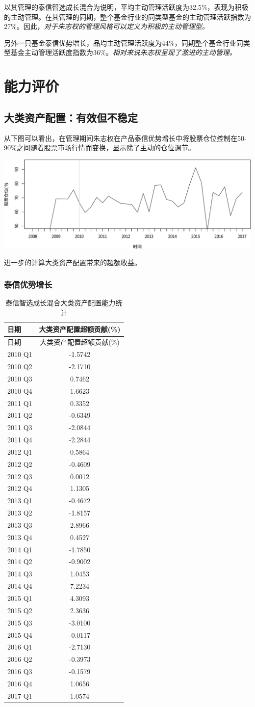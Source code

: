\documentclass[hyperref,]{ctexart}
\begin{document}
以其管理的泰信智选成长混合为说明，平均主动管理活跃度为32.5\%，表现为积极的主动管理。在其管理的同期，整个基金行业的同类型基金的主动管理活跃指数为27\%。因此，\emph{对于朱志权的管理风格可以定义为积极的主动管理型。}

另外一只基金泰信优势增长，品均主动管理活跃度为44\%，同期整个基金行业同类型基金主动管理活跃度指数为36\%。\emph{相对来说朱志权呈现了激进的主动管理。}

\section{能力评价}

\subsection{大类资产配置：有效但不稳定}

从下图可以看出，在管理期间朱志权在产品泰信优势增长中将股票仓位控制在50-90\%之间随着股票市场行情而变换，显示除了主动的仓位调节。

\includegraphics{zzq-detail_files/figure-latex/unnamed-chunk-17-1.pdf}

进一步的计算大类资产配置带来的超额收益。

\subsubsection{泰信优势增长}\label{-1}

\begin{longtable}[]{@{}lc@{}}
\caption{泰信智选成长混合大类资产配置能力统计}\tabularnewline
\toprule
日期 & 大类资产配置超额贡献(\%)\tabularnewline
\midrule
\endfirsthead
\toprule
日期 & 大类资产配置超额贡献(\%)\tabularnewline
\midrule
\endhead
2010 Q1 & -1.5742\tabularnewline
2010 Q2 & -2.1710\tabularnewline
2010 Q3 & 0.7462\tabularnewline
2010 Q4 & 1.6623\tabularnewline
2011 Q1 & 0.3352\tabularnewline
2011 Q2 & -0.6349\tabularnewline
2011 Q3 & -2.0844\tabularnewline
2011 Q4 & -2.2844\tabularnewline
2012 Q1 & 0.5864\tabularnewline
2012 Q2 & -0.4609\tabularnewline
2012 Q3 & 0.0012\tabularnewline
2012 Q4 & 1.1305\tabularnewline
2013 Q1 & -0.4672\tabularnewline
2013 Q2 & -1.8157\tabularnewline
2013 Q3 & 2.8966\tabularnewline
2013 Q4 & 0.4527\tabularnewline
2014 Q1 & -1.7850\tabularnewline
2014 Q2 & -0.9002\tabularnewline
2014 Q3 & 1.0453\tabularnewline
2014 Q4 & 7.2234\tabularnewline
2015 Q1 & 4.3093\tabularnewline
2015 Q2 & 2.3636\tabularnewline
2015 Q3 & -3.0100\tabularnewline
2015 Q4 & -0.0117\tabularnewline
2016 Q1 & -2.7130\tabularnewline
2016 Q2 & -0.3973\tabularnewline
2016 Q3 & -0.1579\tabularnewline
2016 Q4 & 1.0656\tabularnewline
2017 Q1 & 1.0574\tabularnewline
\bottomrule
\end{longtable}
\end{document}

